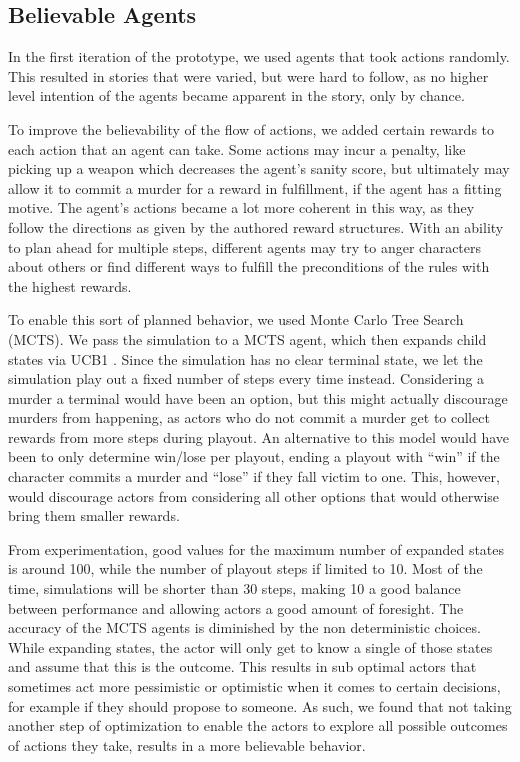 \subsection{Believable Agents}
In the first iteration of the prototype, we used agents that took actions randomly. This resulted in stories that were varied, but were hard to follow, as no higher level intention of the agents became apparent in the story, only by chance.

To improve the believability of the flow of actions, we added certain rewards to each action that an agent can take. Some actions may incur a penalty, like picking up a weapon which decreases the agent's sanity score, but ultimately may allow it to commit a murder for a reward in fulfillment, if the agent has a fitting motive. The agent's actions became a lot more coherent in this way, as they follow the directions as given by the authored reward structures. With an ability to plan ahead for multiple steps, different agents may try to anger characters about others or find different ways to fulfill the preconditions of the rules with the highest rewards. 

To enable this sort of planned behavior, we used Monte Carlo Tree Search (MCTS). We pass the simulation to a MCTS agent, which then expands child states via UCB1 . Since the simulation has no clear terminal state, we let the simulation play out a fixed number of steps every time instead. Considering a murder a terminal would have been an option, but this might actually discourage murders from happening, as actors who do not commit a murder get to collect rewards from more steps during playout. An alternative to this model would have been to only determine win/lose per playout, ending a playout with \enquote{win} if the character commits a murder and \enquote{lose} if they fall victim to one. This, however, would discourage actors from considering all other options that would otherwise bring them smaller rewards.

From experimentation, good values for the maximum number of expanded states is around 100, while the number of playout steps if limited to 10. Most of the time, simulations will be shorter than 30 steps, making 10 a good balance between performance and allowing actors a good amount of foresight. The accuracy of the MCTS agents is diminished by the non deterministic choices. While expanding states, the actor will only get to know a single of those states and assume that this is the outcome. This results in sub optimal actors that sometimes act more pessimistic or optimistic when it comes to certain decisions, for example if they should propose to someone. As such, we found that not taking another step of optimization to enable the actors to explore all possible outcomes of actions they take, results in a more believable behavior.

